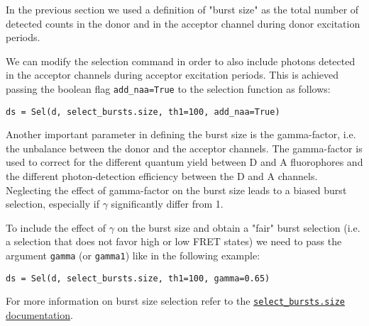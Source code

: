 In the previous section we used a definition of "burst size" as the total number
of detected counts in the donor and in the acceptor channel during donor
excitation periods. 

We can modify the selection command in order to also include photons detected in
the acceptor channels during acceptor excitation periods. This is achieved
passing the boolean flag \verb|add_naa=True| to the selection function as
follows:

\begin{verbatim}
ds = Sel(d, select_bursts.size, th1=100, add_naa=True)
\end{verbatim}

Another important parameter in defining the burst size is the gamma-factor, i.e.
the unbalance between the donor and the acceptor channels. The gamma-factor is
used to correct for the different quantum yield between D and A fluorophores and
the different photon-detection efficiency between the D and A channels.
Neglecting the effect of gamma-factor on the burst size leads to a biased burst
selection, especially if $\gamma$ significantly differ from 1. 

To include the effect of $\gamma$ on the burst size and obtain a "fair" burst
selection (i.e. a selection that does not favor high or low FRET states) we
need to pass the argument \verb|gamma| (or \verb|gamma1|) like in the following
example:

\begin{verbatim}
ds = Sel(d, select_bursts.size, th1=100, gamma=0.65)
\end{verbatim}

For more information on burst size selection refer to the
\href{http://fretbursts.readthedocs.org/en/latest/burst_selection.html#fretbursts.select\_bursts.size}{\texttt{select\_bursts.size} documentation}.


